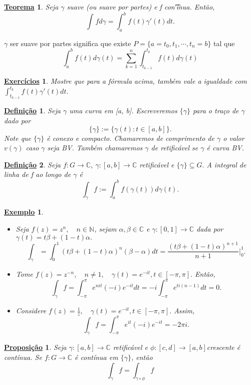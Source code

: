 \documentclass{article}
\newtheorem*{def*}{\underline{Defini\c c\~ao}}
\newtheorem*{theorem*}{\underline{Teorema}}
\newtheorem{example}{\underline{Exemplo}}[section]
\newtheorem*{prop*}{\underline{Proposi\c c\~ao}}
\newtheorem*{exer*}{\underline{Exerc\'icios}}
\begin{document}
\begin{theorem*}
  Seja $\gamma$ suave (ou suave por partes) e f con\t'inua. Ent\~ao, 
  $$
  \int_{}^{}f d \gamma = \int_{a}^{b}f(t)\gamma'(t)dt.
  $$
\end{theorem*}
$\gamma$ ser suave por partes significa que existe $P =\{a=t_{0}, t_1, \cdots, t_{n} = b\} $ tal que 
  $$
  \int_{a}^{b}f(t)d\gamma(t) = \sum\limits_{k=1}^{n}\int_{t_{k-1}}^{t_{k}}f(t)d\gamma(t)
  $$
 \begin{exer*}
   Mostre que para a f\'ormula acima, tamb\'em vale a igualdade com $\int_{t_{k-1}}^{t_{k}}f(t)\gamma'(t)dt.$
 \end{exer*}
 \begin{def*}
   Seja $\gamma$ uma curva em [a, b]. Escreveremos $\{\gamma\} $ para o tra\c co de $\gamma$ dado por 
   $$
   \{\gamma\}:= \{\gamma(t): t\in{[a, b]}\}.
   $$
   Note que $\{\gamma\} $ \'e conexo e compacto. Chamaremos de comprimento de $\gamma$ o valor $v(\gamma)$ caso $\gamma$ seja BV.
Tamb\'em chamaremos $\gamma$ de retific\'avel se $\gamma$ \'e curva BV.
 \end{def*}
\begin{def*}
  Seja $f:G\rightarrow \mathbb{C}$, $\gamma:[a, b]\rightarrow \mathbb{C}$ retific\'avel e $\{\gamma\}\subseteq{G}.$ A integral de 
linha de f ao longo de $\gamma$ \'e 
  $$
  \int_{\gamma}^{}f := \int_{a}^{b}f(\gamma(t))d\gamma(t).
  $$
\end{def*}
\begin{example}
 \begin{itemize}
   \item[i)] Seja $f(z) = z^n, \quad n\in{\mathbb{N}}$, sejam $\alpha, \beta\in \mathbb{C}$ e $\gamma:[0, 1]\rightarrow \mathbb{C}$
  dada por $\gamma(t) = t \beta + (1-t)\alpha.$
    $$
    \int_{\gamma}^{}=\int_{0}^{1}(t\beta + (1-t)\alpha)^n(\beta - \alpha)dt = \frac{(t\beta + (1-t)\alpha)^{n+1}}{n+1}\biggl|_0^1\biggr.
    $$
  \item[ii)] Tome $f(z) = z^{-n}, \quad n\neq1, \quad \gamma(t) = e^{-it}, t\in[-\pi, \pi].$ Ent\~ao,
    $$
    \int_{\gamma}^{}f = \int_{-\pi}^{\pi}e^{nit}(-i)e^{-it}dt = -i \int_{-\pi}^{\pi}e^{ti(n-1)}dt = 0.
    $$
  \item[iii)] Considere $f(z) = \frac{1}{z}, \quad \gamma(t) = e^{-it}, t\in[-\pi, \pi].$ Assim, 
    $$
    \int_{\gamma}^{}f = \int_{-\pi}^{\pi}e^{it}(-i)e^{-it} = -2\pi i.
    $$
 \end{itemize}
\end{example}
\begin{prop*}
  Seja $\gamma:[a, b]\rightarrow \mathbb{C}$ retific\'avel e $\phi:[c, d]\rightarrow [a, b]$crescente \'e cont\'inua. Se $f:G\rightarrow \mathbb{C}$
  \'e cont\'inua em $\{\gamma\} $, ent\~ao 
  $$
  \int_{\gamma}^{}f = \int_{\gamma\circ{\phi}}^{}f
  $$
\end{prop*}
\end{document}
